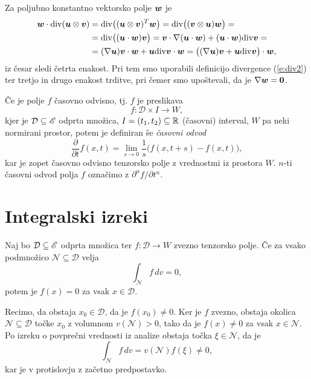 	Za poljubno konstantno vektorsko polje $\boldsymbol w$ je
	\begin{align*}
		\boldsymbol w\cdot\mathrm{div}(\boldsymbol u\otimes\boldsymbol v)&=\mathrm{div}\big((\boldsymbol u\otimes\boldsymbol v)^T\boldsymbol w\big)=
		\mathrm{div}\big((\boldsymbol v\otimes\boldsymbol u)\boldsymbol w\big)=\\
		&=\mathrm{div}\big((\boldsymbol u\cdot\boldsymbol w)\boldsymbol v\big)=\boldsymbol v\cdot\nabla(\boldsymbol u\cdot\boldsymbol w)+(\boldsymbol u\cdot\boldsymbol w)\mathrm{div}\boldsymbol v=\\
		&=(\nabla\boldsymbol u)\boldsymbol v\cdot\boldsymbol w+\boldsymbol u\mathrm{div}\boldsymbol v\cdot\boldsymbol w=\big((\nabla\boldsymbol u)\boldsymbol v+\boldsymbol u\mathrm{div}\boldsymbol v\big)\cdot\boldsymbol w,
	\end{align*}
	iz česar sledi četrta enakost. Pri tem smo uporabili definicijo divergence (\ref{e:div2}) ter
	tretjo in drugo enakost trditve, pri čemer smo upoštevali, da je $\nabla\boldsymbol w=\mathbf 0$.
\endproof

Če je polje $f$ časovno odvisno, tj. $f$ je preslikava
\[ f\colon\mathcal{D}\times I\to W, \]
kjer je $\mathcal{D}\subseteq\mathscr E$ odprta množica, $I=(t_1,t_2)\subseteq\mathbb R$ (časovni) interval, $W$ pa neki normirani prostor,
potem je definiran še \emph{časovni odvod}
\[ \frac{\partial}{\partial t}f(x,t) = \lim_{s\to 0}\frac{1}{s}\Big(f(x,t+s)-f(x,t)\Big), \]
kar je zopet časovno odvisno tenzorsko polje z vrednostmi iz prostora $W$. $n$-ti
časovni odvod polja $f$ označimo z $\partial^n f/\partial t^n$.


\section{Integralski izreki}


\begin{trditev}\label{t:oiz}
	Naj bo $\mathcal{D}\subseteq\mathscr E$ odprta množica ter $f\colon\mathcal{D}\to W$ zvezno tenzorsko polje.
	Če za vsako podmnožico $\mathcal{N}\subseteq\mathcal{D}$ velja
	\[ \int_{\mathcal{N}}f\,dv=0, \]
	potem je $f(x)=0$ za vsak $x\in\mathcal{D}$.
\end{trditev}
\proof
	Recimo, da obstaja $x_0\in\mathcal{D}$, da je $f(x_0)\neq 0$. Ker je $f$ zvezno, obstaja okolica
	$\mathcal{N}\subseteq\mathcal{D}$ točke $x_0$ z volumnom $v(\mathcal{N})>0$, tako da je $f(x)\neq 0$
	za vsak $x\in\mathcal{N}$. Po izreku o povprečni vrednosti iz analize obstaja točka $\xi\in\mathcal{N}$, da je
	\[ \int_{\mathcal{N}}f\,dv=v(\mathcal{N})f(\xi)\neq 0, \]
	kar je v protislovju z začetno predpostavko.
\endproof

